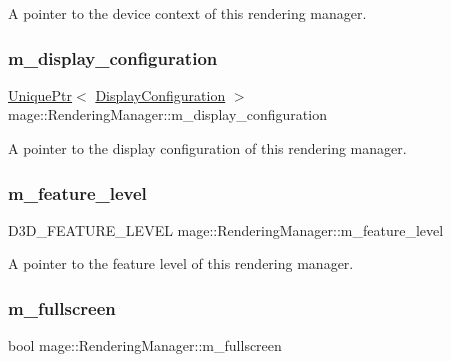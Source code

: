 A pointer to the device context of this rendering manager. \hypertarget{classmage_1_1_rendering_manager_a23a8d0b6bccba3379eafcece28b28090}{}\label{classmage_1_1_rendering_manager_a23a8d0b6bccba3379eafcece28b28090} 
\subsubsection{\texorpdfstring{m\+\_\+display\+\_\+configuration}{m\_display\_configuration}}
{\footnotesize\ttfamily \hyperlink{namespacemage_a3316d7143a973e37adf1110f2e80ca31}{Unique\+Ptr}$<$ \hyperlink{structmage_1_1_display_configuration}{Display\+Configuration} $>$ mage\+::\+Rendering\+Manager\+::m\+\_\+display\+\_\+configuration\hspace{0.3cm}{\ttfamily [private]}}

A pointer to the display configuration of this rendering manager. \hypertarget{classmage_1_1_rendering_manager_a46dc60cd94efc7ad370fd64bd9d6813d}{}\label{classmage_1_1_rendering_manager_a46dc60cd94efc7ad370fd64bd9d6813d} 
\subsubsection{\texorpdfstring{m\+\_\+feature\+\_\+level}{m\_feature\_level}}
{\footnotesize\ttfamily D3\+D\+\_\+\+F\+E\+A\+T\+U\+R\+E\+\_\+\+L\+E\+V\+EL mage\+::\+Rendering\+Manager\+::m\+\_\+feature\+\_\+level\hspace{0.3cm}{\ttfamily [private]}}

A pointer to the feature level of this rendering manager. \hypertarget{classmage_1_1_rendering_manager_a0727a7c76e5e7328b67601248708c98c}{}\label{classmage_1_1_rendering_manager_a0727a7c76e5e7328b67601248708c98c} 
\subsubsection{\texorpdfstring{m\+\_\+fullscreen}{m\_fullscreen}}
{\footnotesize\ttfamily bool mage\+::\+Rendering\+Manager\+::m\+\_\+fullscreen\hspace{0.3cm}{\ttfamily [private]}}

